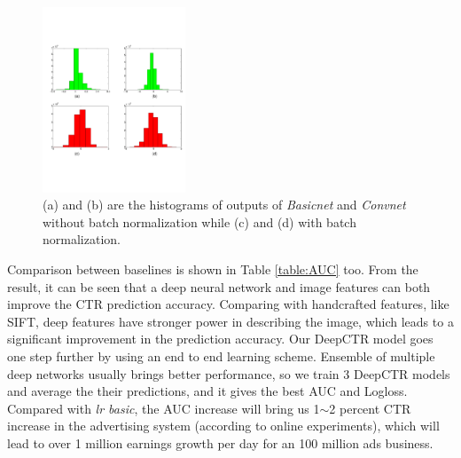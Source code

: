 \documentclass{sig-alternate}
\begin{document}
\begin{figure}
	\centering
	\includegraphics[width=0.38\textwidth]{bn_hist_fix_3}
	\caption{(a) and (b) are the histograms of outputs of \emph{Basicnet} and \emph{Convnet} without batch normalization while (c) and (d) with batch normalization. }
	\label{fig:bn_comb}
\end{figure}

Comparison between baselines is shown in Table \ref{table:AUC} too. From the result, it can be seen that a deep neural network and image features can both improve the CTR prediction accuracy. Comparing with handcrafted features, like SIFT, deep features have stronger power in describing the image, which leads to a significant improvement in the prediction accuracy. Our DeepCTR model goes one step further by using an end to end learning scheme. Ensemble of multiple deep networks usually brings better performance, so we train 3 DeepCTR models and average the their predictions, and it gives the best AUC and Logloss. Compared with \emph{lr basic}, the AUC increase will bring us 1$\sim$2 percent CTR increase in the advertising system (according to online experiments), which will lead to over 1 million earnings growth per day for an 100 million ads business.  
\end{document}
